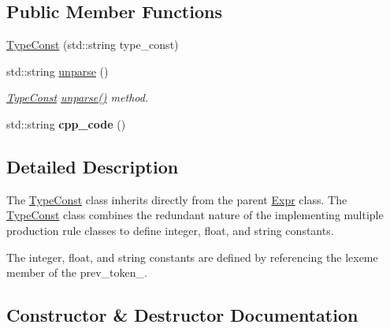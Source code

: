 \subsection*{Public Member Functions}
\begin{DoxyCompactItemize}
\item 
\hyperlink{classfcal_1_1ast_1_1TypeConst_a2998d1bfa03a2f75ca2adce7c63bf3ed}{Type\+Const} (std\+::string type\+\_\+const)
\item 
std\+::string \hyperlink{classfcal_1_1ast_1_1TypeConst_a27bef5d33e36ccf1a6d997da29f0cc8d}{unparse} ()
\begin{DoxyCompactList}\small\item\em \hyperlink{classfcal_1_1ast_1_1TypeConst}{Type\+Const} \hyperlink{classfcal_1_1ast_1_1TypeConst_a27bef5d33e36ccf1a6d997da29f0cc8d}{unparse()} method. \end{DoxyCompactList}\item 
std\+::string {\bfseries cpp\+\_\+code} ()\hypertarget{classfcal_1_1ast_1_1TypeConst_a55e5d8767c1bba35f64782f76c646f41}{}\label{classfcal_1_1ast_1_1TypeConst_a55e5d8767c1bba35f64782f76c646f41}

\end{DoxyCompactItemize}


\subsection{Detailed Description}
The \hyperlink{classfcal_1_1ast_1_1TypeConst}{Type\+Const} class inherits directly from the parent \hyperlink{classfcal_1_1ast_1_1Expr}{Expr} class. The \hyperlink{classfcal_1_1ast_1_1TypeConst}{Type\+Const} class combines the redundant nature of the implementing multiple production rule classes to define integer, float, and string constants.

The integer, float, and string constants are defined by referencing the lexeme member of the prev\+\_\+token\+\_\+. 

\subsection{Constructor \& Destructor Documentation}
